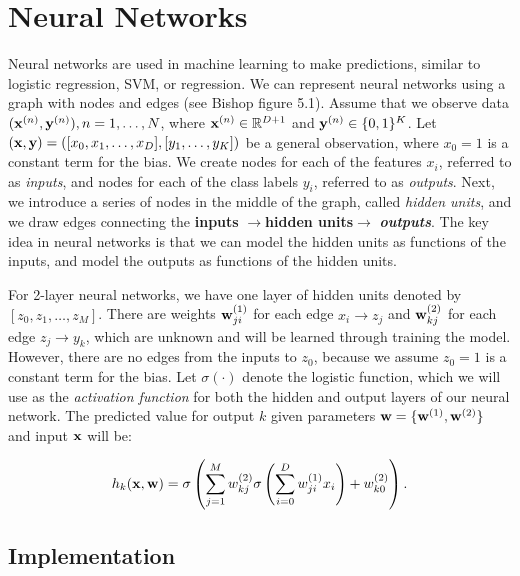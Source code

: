 
\section{Neural Networks}\label{sec:neural_networks}

Neural networks are used in machine learning to make predictions, similar to logistic regression, SVM, or regression.  We can represent neural networks using a graph with nodes and edges (see Bishop figure 5.1).  Assume that we observe data $(\boldsymbol{\mathbf{x}}^{(n)},\boldsymbol{\mathbf{y}}^{(n)}), n = 1, \ldots, N$,  where $\boldsymbol{\mathbf{x}}^{(n)} \in \mathbb{R}^{D+1}$ and $\boldsymbol{\mathbf{y}}^{(n)} \in \{0,1\}^K$.  Let $(\boldsymbol{\mathbf{x}},\boldsymbol{\mathbf{y}}) = ([x_0, x_1, \ldots, x_D],[y_1, \ldots, y_K])$ be a general observation, where $x_0 = 1$ is a constant term for the bias.  We create nodes for each of the features $x_i$, referred to as \emph{inputs}, and nodes for each of the class labels $y_i$, referred to as \emph{outputs}.  Next, we introduce a series of nodes in the middle of the graph, called \emph{hidden units}, and we draw edges connecting the {\bf inputs} $\rightarrow ${\bf hidden units}$ \rightarrow$ \emph{\bf outputs}.  The key idea in neural networks is that we can model the hidden units as functions of the inputs, and model the outputs as functions of the hidden units.   

For 2-layer neural networks, we have one layer of hidden units denoted by $[z_0, z_1,\ldots, z_M]$.   There are weights $\boldsymbol{\mathbf{w}}^{(1)}_{ji}$ for each edge $x_i \rightarrow z_j$ and $\boldsymbol{\mathbf{w}}^{(2)}_{kj}$ for each edge $z_j \rightarrow y_k$, which are unknown and will be learned through training the model.  However, there are no edges from the inputs to $z_0$, because we assume $z_0 = 1$ is a constant term for the bias.  Let $\sigma(\cdot)$ denote the logistic function, which we will use as the \emph{activation function} for both the hidden and output layers of our neural network.  The predicted value for output $k$ given parameters $\boldsymbol{\mathbf{w}} = \{\boldsymbol{\mathbf{w}}^{(1)}, \boldsymbol{\mathbf{w}}^{(2)}\}$ and input $\boldsymbol{\mathbf{x}}$ will be:

\begin{equation}
h_{k}(\boldsymbol{\mathbf{x}},\boldsymbol{\mathbf{w}}) = \sigma\left(\sum_{j=1}^{M} w^{(2)}_{kj} \sigma\left(\sum_{i=0}^{D} w^{(1)}_{ji} x_i\right)  + w_{k0}^{(2)} \right).
\end{equation}

\subsection{Implementation}

